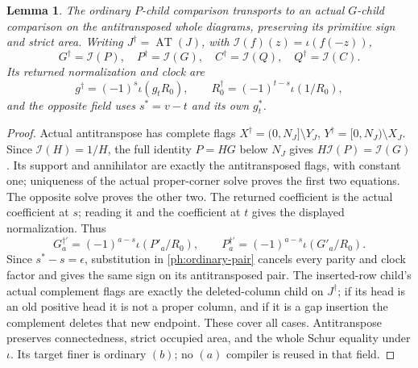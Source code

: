 \documentclass[11pt,a4paper]{amsart}
\numberwithin{equation}{section}
\theoremstyle{plain}
\newtheorem{lemma}[theorem]{Lemma}
\theoremstyle{definition}
\newcommand{\AT}{\operatorname{AT}}
\newcommand{\ii}{\iota}
\begin{document}
\begin{lemma}\label{ph:transpose}
The ordinary \(P\)-child comparison transports to an actual \(G\)-child
comparison on the antitransposed whole diagrams, preserving its primitive
sign and strict area.  Writing \(J^\dagger=\AT(J)\), with \(\mathcal{I}(f)(z)=\ii(f(-z))\),
\[
 G^\dagger=\mathcal{I}(P),\quad P^\dagger=\mathcal{I}(G),\quad
 C^\dagger=\mathcal{I}(Q),\quad Q^\dagger=\mathcal{I}(C).
\]
Its returned normalization and clock are
\[
 g^\dagger=(-1)^s\ii(g_tR_0),\qquad
 R_0^\dagger=(-1)^{t-s}\ii(1/R_0),
\]
and the opposite field uses \(s^*=v-t\) and its own \(g_t^*\).
\end{lemma}
\begin{proof}
Actual antitranspose has complete flags
\(X^\dagger=(0,N_J]\setminus Y_J\),
\(Y^\dagger=[0,N_J)\setminus X_J\).
Since \(\mathcal{I}(H)=1/H\), the full identity \(P=HG\) below \(N_J\)
gives \(H\mathcal{I}(P)=\mathcal{I}(G)\).
Its support and annihilator are exactly the antitransposed flags, with
constant one; uniqueness of the actual proper-corner solve proves the
first two equations.  The opposite solve proves the other two.
The returned coefficient is the actual coefficient at \(s\); reading
it and the coefficient at \(t\) gives the displayed normalization.
Thus
\[
 G^{\dagger'}_a=(-1)^{a-s}\ii(P'_a/R_0),\qquad
 P^{\dagger'}_a=(-1)^{a-s}\ii(G'_a/R_0).
\]
Since \(s^*-s=\epsilon\), substitution in
\eqref{ph:ordinary-pair} cancels every parity and clock factor and
gives the same sign on its antitransposed pair.
The inserted-row child's actual complement flags are exactly the
deleted-column child on \(J^\dagger\); if its head is an old positive
head it is not a proper column, and if it is a gap insertion the
complement deletes that new endpoint.  These cover all cases.
Antitranspose preserves connectedness, strict occupied area, and the whole
Schur equality under \(\ii\).  Its target finer is ordinary \((b)\);
no \((a)\) compiler is reused in that field.
\end{proof}
\end{document}
